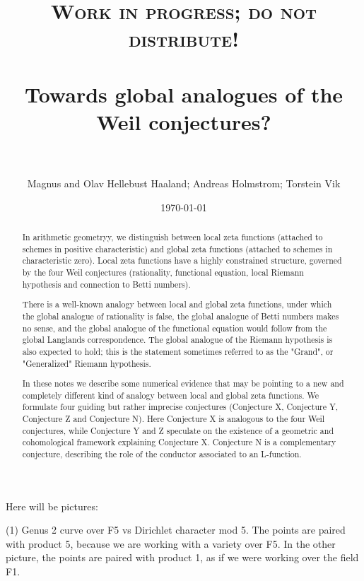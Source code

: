 \documentclass[paper=a4, fontsize=11pt]{scrartcl} %
\title{
\normalfont \normalsize
\textsc{Work in progress; do not distribute!} \\ [25pt] %
\horrule{0.5pt} \\[0.4cm] %
\LARGE Towards global analogues of the Weil conjectures? \\ %
\horrule{2pt} \\[0.5cm] %
}
\author{Magnus and Olav Hellebust Haaland; Andreas Holmstrom; Torstein Vik} %
\date{\normalsize\today} %
\numberwithin{equation}{section} %
\numberwithin{figure}{section} %
\numberwithin{table}{section} %
\begin{document}
\maketitle %


\begin{abstract}
In arithmetic geometryy, we distinguish between local zeta functions (attached to schemes in positive characteristic) and global zeta functions (attached to schemes in characteristic zero). Local zeta functions have a highly constrained structure, governed by the four Weil conjectures (rationality, functional equation, local Riemann hypothesis and connection to Betti numbers).

There is a well-known analogy between local and global zeta functions, under which the global analogue of rationality is false, the global analogue of Betti numbers makes no sense, and the global analogue of the functional equation would follow from the global Langlands correspondence. The global analogue of the Riemann hypothesis is also expected to hold; this is the statement sometimes referred to as the "Grand", or "Generalized" Riemann hypothesis.

In these notes we describe some numerical evidence that may be pointing to a new and completely different kind of analogy between local and global zeta functions. We formulate four guiding but rather imprecise conjectures (Conjecture X, Conjecture Y, Conjecture Z and Conjecture N). Here Conjecture X is analogous to the four Weil conjectures, while Conjecture Y and Z speculate on the existence of a geometric and cohomological framework explaining Conjecture X. Conjecture N is a complementary conjecture, describing the role of the conductor associated to an L-function.


\end{abstract}


\newpage

Here will be pictures:

(1) Genus 2 curve over F5 vs Dirichlet character mod 5. The points are paired with product 5, because we are working with a variety over F5. In the other picture, the points are paired with product 1, as if we were working over the field F1.
\end{document}
